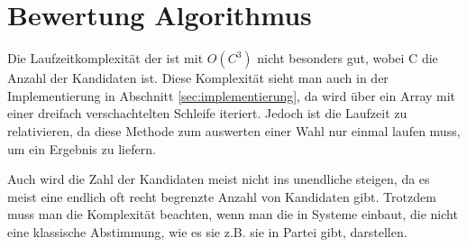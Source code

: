 \section{Bewertung Algorithmus}
\label{sec:Bewertung2}

Die Laufzeitkomplexität der \schulze ist mit $O(C^3)$ nicht besonders gut, wobei C die Anzahl der Kandidaten ist. Diese Komplexität sieht man auch in der Implementierung in Abschnitt \ref{sec:implementierung}, da wird über ein Array mit einer dreifach verschachtelten Schleife iteriert. Jedoch ist die Laufzeit zu relativieren, da diese Methode zum auswerten einer Wahl nur einmal laufen muss, um ein Ergebnis zu liefern.

Auch wird die Zahl der Kandidaten meist nicht ins unendliche steigen, da es meist eine endlich oft recht begrenzte Anzahl von Kandidaten gibt. Trotzdem muss man die Komplexität beachten, wenn man die \schulze in Systeme einbaut, die nicht eine klassische Abstimmung, wie es sie z.B. sie in Partei gibt, darstellen.


